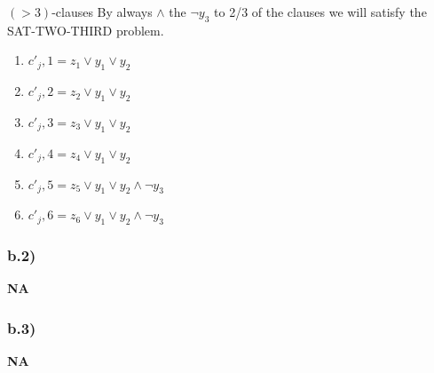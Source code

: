 \documentclass[11pt]{article}
\begin{document}
$(> 3)$-clauses
By always $\land$ the $\neg y_{3}$ to 2/3 of the clauses we will satisfy the SAT-TWO-THIRD problem.
\begin{enumerate}
\item $c'_{j},1 = z_{1} \vee y_{1} \vee y_{2} $
\item $c'_{j},2 = z_{2} \vee y_{1} \vee y_{2} $
\item $c'_{j},3 = z_{3} \vee y_{1} \vee y_{2} $
\item $c'_{j},4 = z_{4} \vee y_{1} \vee y_{2} $
\item $c'_{j},5 = z_{5} \vee y_{1} \vee y_{2} \land \neg y_{3} $
\item $c'_{j},6 = z_{6} \vee y_{1} \vee y_{2} \land \neg y_{3} $
\end{enumerate}

\subsubsection*{b.2)}
\textbf{NA}

\subsubsection*{b.3)}
\textbf{NA}
\end{document}
